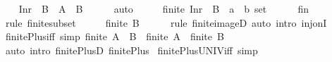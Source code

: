 \begin{isabellebody}
\isamarkupfalse%
\isanewline
\ \ \isamarkupfalse%
\ {\isachardoublequoteopen}Inr\ {\isacharbackquote}{\kern0pt}\ B\ {\isasymsubseteq}\ A\ {\isacharless}{\kern0pt}{\isacharplus}{\kern0pt}{\isachargreater}{\kern0pt}\ B{\isachardoublequoteclose}\isanewline
\ \ \ \ \isamarkupfalse%
\ auto\isanewline
\ \ \isamarkupfalse%
\ \isamarkupfalse%
\ {\isachardoublequoteopen}finite\ {\isacharparenleft}{\kern0pt}Inr\ {\isacharbackquote}{\kern0pt}\ B\ {\isacharcolon}{\kern0pt}{\isacharcolon}{\kern0pt}\ {\isacharparenleft}{\kern0pt}{\isacharprime}{\kern0pt}a\ {\isacharplus}{\kern0pt}\ {\isacharprime}{\kern0pt}b{\isacharparenright}{\kern0pt}\ set{\isacharparenright}{\kern0pt}{\isachardoublequoteclose}\isanewline
\ \ \ \ \isamarkupfalse%
\ fin\ \isamarkupfalse%
\ {\isacharparenleft}{\kern0pt}rule\ finite{\isacharunderscore}{\kern0pt}subset{\isacharparenright}{\kern0pt}\isanewline
\ \ \isamarkupfalse%
\ \isamarkupfalse%
\ {\isachardoublequoteopen}finite\ B{\isachardoublequoteclose}\isanewline
\ \ \ \ \isamarkupfalse%
\ {\isacharparenleft}{\kern0pt}rule\ finite{\isacharunderscore}{\kern0pt}imageD{\isacharparenright}{\kern0pt}\ {\isacharparenleft}{\kern0pt}auto\ intro{\isacharcolon}{\kern0pt}\ inj{\isacharunderscore}{\kern0pt}onI{\isacharparenright}{\kern0pt}\isanewline
{}\isamarkupfalse%
%
\endisatagproof
{\isafoldproof}%
%
\isadelimproof
\isanewline
%
\endisadelimproof
\isanewline
{}\isamarkupfalse%
\ finite{\isacharunderscore}{\kern0pt}Plus{\isacharunderscore}{\kern0pt}iff\ {\isacharbrackleft}{\kern0pt}simp{\isacharbrackright}{\kern0pt}{\isacharcolon}{\kern0pt}\ {\isachardoublequoteopen}finite\ {\isacharparenleft}{\kern0pt}A\ {\isacharless}{\kern0pt}{\isacharplus}{\kern0pt}{\isachargreater}{\kern0pt}\ B{\isacharparenright}{\kern0pt}\ {\isasymlongleftrightarrow}\ finite\ A\ {\isasymand}\ finite\ B{\isachardoublequoteclose}\isanewline
%
\isadelimproof
\ \ %
\endisadelimproof
%
\isatagproof
{}\isamarkupfalse%
\ {\isacharparenleft}{\kern0pt}auto\ intro{\isacharcolon}{\kern0pt}\ finite{\isacharunderscore}{\kern0pt}PlusD\ finite{\isacharunderscore}{\kern0pt}Plus{\isacharparenright}{\kern0pt}%
\endisatagproof
{\isafoldproof}%
%
\isadelimproof
\isanewline
%
\endisadelimproof
\isanewline
{}\isamarkupfalse%
\ finite{\isacharunderscore}{\kern0pt}Plus{\isacharunderscore}{\kern0pt}UNIV{\isacharunderscore}{\kern0pt}iff\ {\isacharbrackleft}{\kern0pt}simp{\isacharbrackright}{\kern0pt}{\isacharcolon}{\kern0pt}\isanewline

\end{isabellebody}
